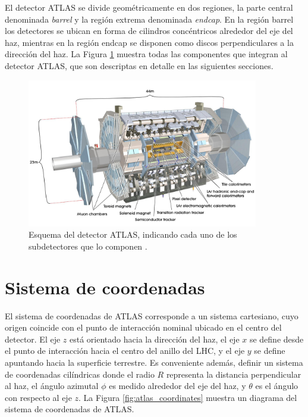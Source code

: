 El detector ATLAS se divide geométricamente en dos regiones, la parte central denominada \textit{barrel} y la región extrema denominada \textit{endcap}. En la región barrel los detectores se ubican en forma de cilindros concéntricos alrededor del eje del haz, mientras en la región endcap se disponen como discos perpendiculares a la dirección del haz. La Figura \ref{fig:atlas_1} muestra todas las componentes que integran al detector ATLAS, que son descriptas en detalle en las siguientes secciones.

\begin{figure}
\centering
  \includegraphics[width=0.9\textwidth]{images/lhc/atlas_1.jpg}
  \caption{Esquema del detector ATLAS, indicando cada uno de los subdetectores que lo componen \cite{Pequenao:1095924}.}
  \label{fig:atlas_1}
\end{figure}

\section{Sistema de coordenadas}

El sistema de coordenadas de ATLAS corresponde a un sistema cartesiano, cuyo origen coincide con el punto de interacción nominal ubicado en el centro del detector. El eje $z$ está orientado hacia la dirección del haz, el eje $x$ se define desde el punto de interacción hacia el centro del anillo del LHC, y el eje $y$ se define apuntando hacia la superficie terrestre. Es conveniente además, definir un sistema de coordenadas cilíndricas donde el radio $R$ representa la distancia perpendicular al haz, el ángulo azimutal $\phi$ es medido alrededor del eje del haz, y $\theta$ es el ángulo con respecto al eje $z$. La Figura \ref{fig:atlas_coordinates} muestra un diagrama del sistema de coordenadas de ATLAS.

